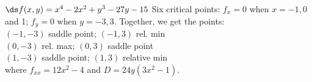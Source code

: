 {$\ds f(x,y) = x^4-2x^2+y^3-27y-15$
}
{
Six critical points: $f_x = 0$ when $x=-1,0$ and 1; $f_y = 0$ when $y = -3,3$. Together, we get the points:\\
$(-1,-3)$ saddle point;		$(-1,3)$ rel. min\\
$(0,-3)$	rel. max;	$(0,3)$ saddle point\\
$(1,-3)$ saddle point; 		$(1,3)$ relative min\\
where
$f_{xx} = 12x^2-4$ and $D = 24y(3x^2-1)$.
}